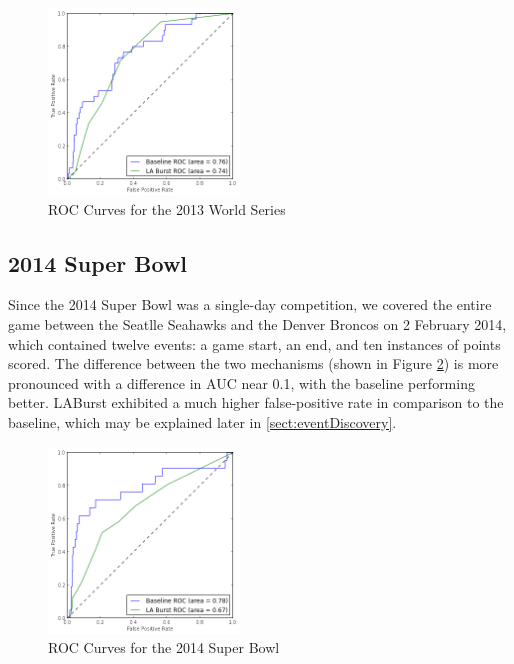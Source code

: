 \documentclass{sig-alternate}
\begin{document}
\begin{figure}[hbtp]
\begin{center}
\includegraphics[width=2in]{./figures/roc_2013_WorldSeries.png}
\caption{ROC Curves for the 2013 World Series}
\label{fig:roc2013WorldSeries}
\end{center}
\end{figure}

\subsection{2014 Super Bowl}

Since the 2014 Super Bowl was a single-day competition, we covered the entire game between the Seatlle Seahawks and the Denver Broncos on 2 February 2014, which contained twelve events: a game start, an end, and ten instances of points scored.
The difference between the two mechanisms (shown in Figure \ref{fig:roc2014SuperBowl}) is more pronounced with a difference in AUC near 0.1, with the baseline performing better.
LABurst exhibited a much higher false-positive rate in comparison to the baseline, which may be explained later in \ref{sect:eventDiscovery}.

\begin{figure}[hbtp]
\begin{center}
\includegraphics[width=2in]{./figures/roc_2014_SuperBowl.png}
\caption{ROC Curves for the 2014 Super Bowl}
\label{fig:roc2014SuperBowl}
\end{center}
\end{figure}
\end{document}
